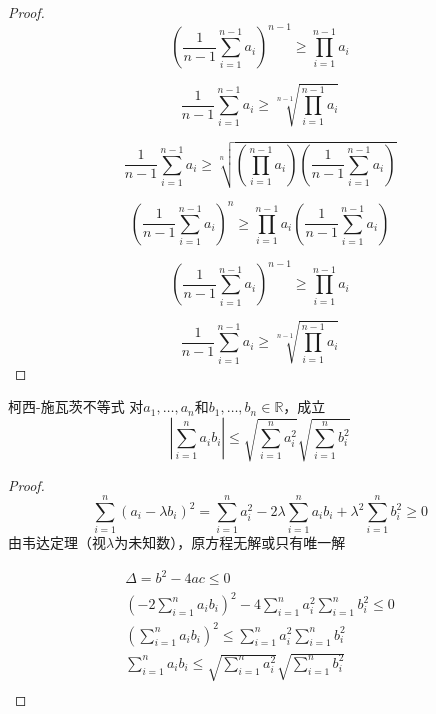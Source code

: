 \begin{proof}
\begin{equation}	
	(\frac{1}{n-1}\sum_{i=1}^{n-1}a_i)^{n-1}
	\geq \prod_{i=1}^{n-1}a_i
\end{equation}


\begin{equation}		
	\frac{1}{n-1}\sum_{i=1}^{n-1}a_i
	\geq \sqrt[n-1]{\prod_{i=1}^{n-1}a_i}
\end{equation}


\begin{equation}
	\frac{1}{n-1}\sum_{i=1}^{n-1}a_i \geq \sqrt[n]{(\prod_{i=1}^{n-1}a_i)(\frac{1}{n-1}\sum_{i=1}^{n-1}a_i)}
\end{equation}

\begin{equation}
	( \frac{1}{n-1}\sum_{i=1}^{n-1}a_i )^n \geq \prod_{i=1}^{n-1}a_i(\frac{1}{n-1}\sum_{i=1}^{n-1}a_i)
\end{equation}

\begin{equation}
	( \frac{1}{n-1}\sum_{i=1}^{n-1}a_i )^{n-1} \geq \prod_{i=1}^{n-1}a_i
\end{equation}

\begin{equation}
 \frac{1}{n-1}\sum_{i=1}^{n-1}a_i  \geq \sqrt[n-1]{\prod_{i=1}^{n-1}a_i}
\end{equation}

\end{proof}

\begin{theorem}
	{柯西-施瓦茨不等式}
	对$ a_1,\dots,a_n $和$ b_1, \dots ,b_n \in \mathbb{R}$，成立
	\begin{equation}
		|\sum_{i=1}^n a_ib_i|\leq \sqrt{\sum_{i=1}^n a_i^2}\sqrt{\sum_{i=1}^n b_i^2}
	\end{equation}
	\label{1.3.5}
\end{theorem}
\begin{proof}
	\[ \sum_{i=1}^n (a_i - \lambda b_i)^2 = \sum_{i=1}^n a_i^2 - 2\lambda \sum_{i=1}^n a_i b_i + \lambda^2 \sum_{i=1}^n b_i^2 \geq 0  \]
	由韦达定理（视$ \lambda $为未知数），原方程无解或只有唯一解
	
	\begin{equation}
		\begin{aligned}
		 \Delta = b^2-4ac \leq 0\\
		 (-2\sum_{i=1}^n a_i b_i)^2-4\sum_{i=1}^na_i^2\sum_{i=1}^nb_i^2\leq 0\\	
		 (\sum_{i=1}^n a_i b_i)^2 \leq \sum_{i=1}^na_i^2\sum_{i=1}^nb_i^2\\
		 \sum_{i=1}^n a_i b_i \leq \sqrt{\sum_{i=1}^na_i^2}\sqrt{\sum_{i=1}^nb_i^2}\\
	 \end{aligned}
	\end{equation}
\end{proof}

